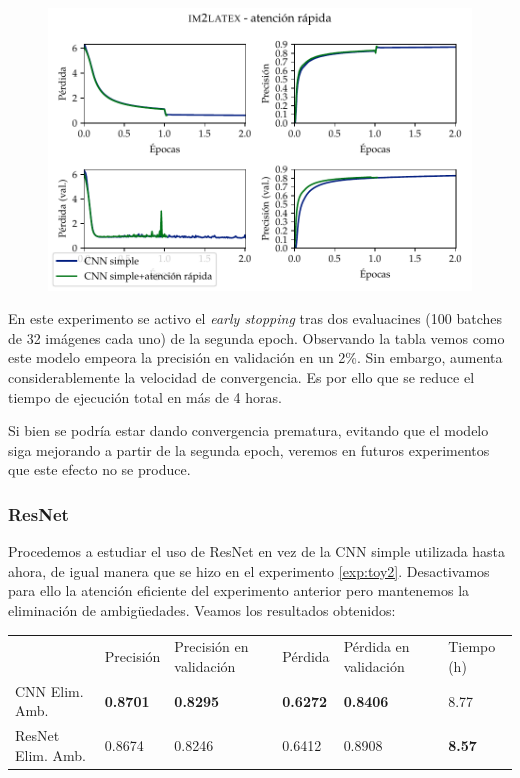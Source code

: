 \documentclass[a4paper, 20pt, dvipsnames]{article}
\begin{document}
\begin{figure}[H]
	\centering
	\includegraphics{fig/im2latex-3a.pdf}
\end{figure}


En este experimento se activo el \emph{early stopping} tras dos evaluacines (100 batches
de 32 imágenes cada uno) de la segunda epoch. Observando la tabla vemos como este modelo empeora
la precisión en validación en un 2\%. Sin embargo, aumenta considerablemente la velocidad
de convergencia. Es por ello que se reduce el tiempo de ejecución total en más de 4 horas.

Si bien se podría estar dando convergencia prematura, evitando que el modelo siga mejorando
a partir de la segunda epoch, veremos en futuros experimentos que este efecto no se produce.

\subsubsection{ResNet}
\label{exp:3b}

Procedemos a estudiar el uso de ResNet en vez de la CNN simple utilizada hasta ahora,
de igual manera que se hizo en el experimento \ref{exp:toy2}. Desactivamos para ello
la atención eficiente del experimento anterior pero mantenemos la eliminación de
ambigüedades. Veamos los resultados obtenidos:

\begin{table}[H]
	\centering
	\begin{tabular}{llllll}
		& Precisión       & Precisión en validación & Pérdida         & Pérdida en validación & Tiempo (h)    \\ \cline{2-6} 
		CNN Elim. Amb.    & \textbf{0.8701} & \textbf{0.8295}         & \textbf{0.6272} & \textbf{0.8406}       & 8.77          \\
		ResNet Elim. Amb. & 0.8674          & 0.8246                  & 0.6412          & 0.8908                & \textbf{8.57}
	\end{tabular}
\end{table}
\end{document}
